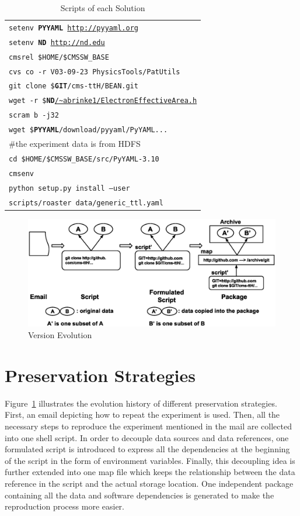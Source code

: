 \documentclass{acm_proc_article-sp}
\begin{document}
\begin{table}
\begin{tabular}{|l|}
        {\tt setenv {\bf PYYAML} \url{http://pyyaml.org}} \\
        {\tt setenv {\bf ND} \url{http://nd.edu}} \\
        {\tt cmsrel \$HOME/\$CMSSW\_BASE} \\
        {\tt cvs co -r V03-09-23 PhysicsTools/PatUtils} \\
        {\tt git clone \${\bf GIT}/cms-ttH/BEAN.git} \\
        {\tt wget -r \${\bf ND}\url{/~abrinke1/ElectronEffectiveArea.h}} \\
        {\tt scram b -j32} \\
        {\tt wget \${\bf PYYAML}/download/pyyaml/PyYAML...}\\
        \#the experiment data is from HDFS \\
        {\tt cd \$HOME/\$CMSSW\_BASE/src/PyYAML-3.10}\\
        {\tt cmsenv}\\
        {\tt python setup.py install --user} \\
        {\tt scripts/roaster data/generic\_ttl.yaml} \\ 
        \hline
    \end{tabular}
    \caption{Scripts of each Solution}
    \label{table:scripts}
\end{table}

\begin{figure}
\centering
\includegraphics[width=1.6\columnwidth]{version-evolution.eps}
\caption{Version Evolution}
\label{fig:version-evolution}
\end{figure}

\section{Preservation Strategies}

Figure~\ref{fig:version-evolution} illustrates the evolution history of
different preservation strategies. First, an email depicting how to repeat the
experiment is used. Then, all the necessary steps to reproduce the experiment
mentioned in the mail are collected into one shell script. In order to decouple
data sources and data references, one formulated script is introduced
to express all the dependencies at the beginning of the script in the form of
environment variables. Finally, this decoupling idea is further extended into
one map file which keeps the relationship between the data reference in the
script and the actual storage location. One independent package containing all
the data and software dependencies is generated to make the reproduction
process more easier.  
\end{document}
